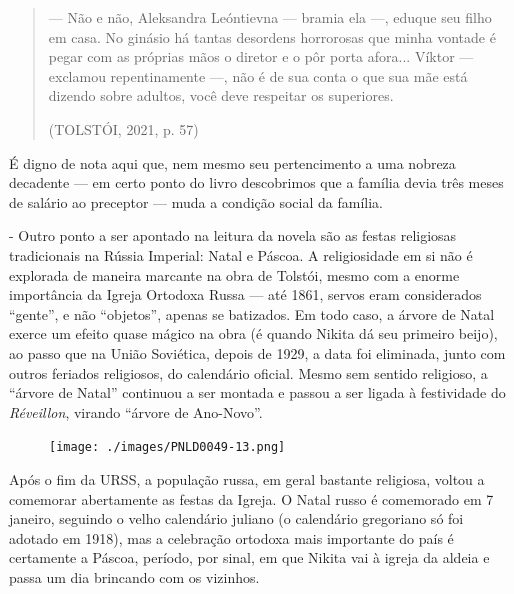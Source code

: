 \documentclass{article}
\begin{document}
\begin{quote}
--- Não e não, Aleksandra Leóntievna --- bramia ela ---, eduque seu
filho em casa. No ginásio há tantas desordens horrorosas que minha
vontade é pegar com as próprias mãos o diretor e o pôr porta afora...
Víktor --- exclamou repentinamente ---, não é de sua conta o que sua mãe
está dizendo sobre adultos, você deve respeitar os superiores.

(TOLSTÓI, 2021, p. 57)
\end{quote}

É digno de nota aqui que, nem mesmo seu pertencimento a uma nobreza
decadente --- em certo ponto do livro descobrimos que a família devia
três meses de salário ao preceptor --- muda a condição social da
família.

- Outro ponto a ser apontado na leitura da novela são as festas
religiosas tradicionais na Rússia Imperial: Natal e Páscoa. A
religiosidade em si não é explorada de maneira marcante na obra de
Tolstói, mesmo com a enorme importância da Igreja Ortodoxa Russa --- até
1861, servos eram considerados ``gente'', e não ``objetos'', apenas se
batizados. Em todo caso, a árvore de Natal exerce um efeito quase mágico
na obra (é quando Nikita dá seu primeiro beijo), ao passo que na União
Soviética, depois de 1929, a data foi eliminada, junto com outros
feriados religiosos, do calendário oficial. Mesmo sem sentido religioso,
a ``árvore de Natal'' continuou a ser montada e passou a ser ligada à
festividade do \emph{Réveillon}, virando ``árvore de Ano-Novo''.

\begin{figure}[ht!]
\texttt{[image: ./images/PNLD0049-13.png]}
\end{figure}

Após o fim da URSS, a população russa, em geral bastante religiosa,
voltou a comemorar abertamente as festas da Igreja. O Natal russo é
comemorado em 7 janeiro, seguindo o velho calendário juliano (o
calendário gregoriano só foi adotado em 1918), mas a celebração ortodoxa
mais importante do país é certamente a Páscoa, período, por sinal, em
que Nikita vai à igreja da aldeia e passa um dia brincando com os
vizinhos.

\end{document}
